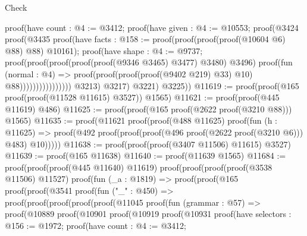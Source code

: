 \begin{lexlean}{Check}
\begin{coremodule}
                                    proof(have count : @4 := @3412;
                                      proof(have given : @4 := @10553;
                                        proof(@3424
                                            proof(@3435
                                                proof(have facts : @158 := proof(proof(proof(proof(@10604
                                                            @6)
                                                          @88)
                                                        @88)
                                                      @10161);
                                                  proof(have shape : @4 := @9737;
                                                    proof(proof(proof(proof(proof(@9346 @3465)
                                                              @3477)
                                                            @3480)
                                                          @3496)
                                                        proof(fun (normal : @4) =>
                                                          proof(proof(proof(proof(@9402 @219) @33)
                                                                @10)
                                                              @88))))))))))))))))
              @3213)
            @3217)
          @3221)
        @3225))
@11619 := proof(proof(@165 proof(proof(@11528 @11615) @3527)) @1565)
@11621 := proof(proof(@445 @11619) @486)
@11625 := proof(proof(@165 proof(@2622 proof(@3210 @88))) @1565)
@11635 := proof(@11621
      proof(proof(@488 @11625)
          proof(fun (h : @11625) =>
            proof(@492 proof(proof(proof(@496 proof(@2622 proof(@3210 @6))) @483) @10)))))
@11638 := proof(proof(proof(@3407 @11506) @11615) @3527)
@11639 := proof(@165 @11638)
@11640 := proof(@11639 @1565)
@11684 := proof(proof(proof(@445 @11640) @11619)
      proof(proof(proof(proof(@3538 @11506) @11527)
            proof(fun (_a : @1819) =>
              proof(proof(@165
                    proof(proof(@3541
                          proof(fun ("_" : @450) =>
                            proof(proof(proof(proof(proof(@11045
                                        proof(fun (grammar : @57) =>
                                          proof(@10889
                                              proof(@10901
                                                  proof(@10919
                                                      proof(@10931
                                                          proof(have selectors : @156 := @1972;
                                                            proof(have count : @4 := @3412;

\end{coremodule}
\end{lexlean}
